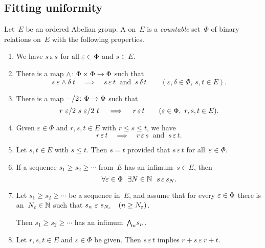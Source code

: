 \documentclass[main.tex]{subfiles}
\begin{document}
\subsection{Fitting uniformity}
\label{SS:fitting}
%
%
\begin{dfn}
\label{D:uniformity}
Let~$E$ be an ordered Abelian group.
A  on~$E$
is a \emph{countable} set~$\Phi$ of binary relations on~$E$
with the following properties.
\begin{enumerate}
\item 
\label{E-refl}
We have $s \,\varepsilon\, s$ for all $\varepsilon \in \Phi$ and $s \in E$.
\item
There is a map $\wedge\colon \Phi\times\Phi \rightarrow \Phi$
such that
\begin{equation*}
s \ \varepsilon\wedge\delta\  t
\quad\implies\quad
s \,\varepsilon\,t\ \text{ and }\ s\,\delta\,t
\qquad (\varepsilon,\delta\in\Phi,\ s,t\in E).
\end{equation*}

\item
\label{E-half}
There is a map $-/2\colon \Phi \rightarrow \Phi$
such that
\begin{equation*}
r\ \varepsilon/2 \ s \ \varepsilon/2 \ t
\quad\implies\quad
r \,\varepsilon\, t\qquad(\varepsilon\in\Phi,\ r,s,t\in E).
\end{equation*}

\item \label{E-ord}
Given $\varepsilon\in\Phi$ and $r,s,t\in E$ 
with $r\leq s\leq t$,
we have
\begin{equation*}
r\,\varepsilon\,t
\quad\implies\quad
r\,\varepsilon\,s
\ \text{ and }\ 
s\,\varepsilon\,t.
\end{equation*}

\item \label{E-haus}
Let $s,t\in E$ with $s\leq t$.
Then $s=t$ provided that $s\,\varepsilon\,t$ for all~$\varepsilon\in\Phi$.

\item \label{E-inf-conv}
If a sequence $s_1 \geq s_2 \geq \dotsb$ from~$E$
has an infimum~$s\in E$,
then 
\begin{equation*}
\forall\varepsilon\in \Phi
\ \ \exists N\in \mathbb{N}
\ \ s \, \varepsilon\, s_N.
\end{equation*}

\item  \label{E-bound-inf}
Let $s_1\geq s_2 \geq \dotsb$ be a
sequence in~$E$,
and assume that
for every $\varepsilon\in \Phi$
there is an~$N_\varepsilon \in \mathbb{N}$ such that 
$s_{n} \ \varepsilon \ s_{N_\varepsilon}\quad (n\geq N_\varepsilon)$.

Then $s_1 \geq s_2 \geq \dotsb$ has an infimum~$\textstyle{\bigwedge}_n s_n$.

\item \label{E-add}
Let $r,s,t\in E$ and $\varepsilon\in\Phi$ be given.
Then $s\,\varepsilon\,t$ implies $r+s\ \varepsilon\ r+t$.
\setcounter{epropc}{\value{enumi}}
\end{enumerate}
\end{dfn}
\end{document}
